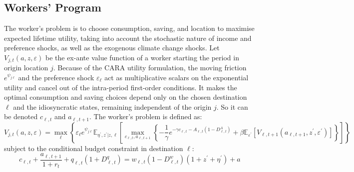 \documentclass[12pt, a4paper]{article}
\begin{document}
\subsection{Workers' Program}
The worker's problem is to choose consumption, saving, and location to maximise expected lifetime utility, taking into account the stochastic nature of income and preference shocks, as well as the exogenous climate change shocks. Let $V_{j,t}(a, z, \varepsilon)$ be the ex-ante value function of a worker starting the period in origin location $j$. Because of the CARA utility formulation, the moving friction $e^{\psi_{j\ell}}$ and the preference shock $\varepsilon_\ell$ act as multiplicative scalars on the exponential utility and cancel out of the intra-period first-order conditions. It makes the optimal consumption and saving choices depend only on the chosen destination $\ell$ and the idiosyncratic states, remaining independent of the origin $j$. So it can be denoted $c_{\ell,t}$ and $a_{\ell,t+1}$. The worker's problem is defined as:
\begin{equation}
V_{j,t}(a, z, \varepsilon) = \max_{\ell} \left\{ \varepsilon_\ell e^{\psi_{j\ell}} \mathbb{E}_{\eta^\prime, z^\prime | z, \ell} \left[ \max_{c_{\ell,t}, a_{\ell,t+1}} \left\{ -\frac{1}{\gamma} e^{-\gamma c_{\ell,t} - A_{\ell,t}(1-D^A_{\ell,t})} + \beta \mathbb{E}_{\varepsilon^\prime} \left[ V_{\ell,t+1}(a_{\ell,t+1}, z^\prime, \varepsilon^\prime) \right] \right\} \right] \right\}
\end{equation}
subject to the conditional budget constraint in destination $\ell$:
\begin{equation}
c_{\ell,t} + \frac{a_{\ell,t+1}}{1 + r_t} + q_{\ell,t}(1+ D^q_{\ell,t}) = w_{\ell,t}(1-D^w_{\ell,t})(1 + z^\prime + \eta^\prime) + a
\end{equation}
\end{document}
